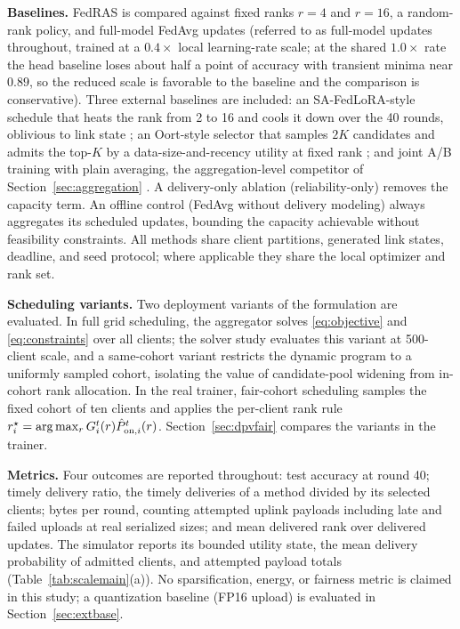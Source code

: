 \documentclass[a4paper,fleqn]{cas-dc}
\begin{document}
\textbf{Baselines.} FedRAS is compared against fixed ranks $r{=}4$ and $r{=}16$, a random-rank policy, and full-model FedAvg updates (referred to as full-model updates throughout, trained at a $0.4\times$ local learning-rate scale; at the shared $1.0\times$ rate the head baseline loses about half a point of accuracy with transient minima near $0.89$, so the reduced scale is favorable to the baseline and the comparison is conservative). Three external baselines are included: an SA-FedLoRA-style schedule that heats the rank from 2 to 16 and cools it down over the 40 rounds, oblivious to link state \cite{yang2024safedlora}; an Oort-style selector that samples $2K$ candidates and admits the top-$K$ by a data-size-and-recency utility at fixed rank \cite{oort2021oort}; and joint A/B training with plain averaging, the aggregation-level competitor of Section~\ref{sec:aggregation} \cite{guo2025fedsalora}. A delivery-only ablation (reliability-only) removes the capacity term. An offline control (FedAvg without delivery modeling) always aggregates its scheduled updates, bounding the capacity achievable without feasibility constraints. All methods share client partitions, generated link states, deadline, and seed protocol; where applicable they share the local optimizer and rank set.

\textbf{Scheduling variants.} Two deployment variants of the formulation are evaluated. In full grid scheduling, the aggregator solves \eqref{eq:objective} and \eqref{eq:constraints} over all clients; the solver study evaluates this variant at 500-client scale, and a same-cohort variant restricts the dynamic program to a uniformly sampled cohort, isolating the value of candidate-pool widening from in-cohort rank allocation. In the real trainer, fair-cohort scheduling samples the fixed cohort of ten clients and applies the per-client rank rule $r_i^\star=\arg\max_r G_i^t(r)\hat P_{{\rm on},i}^t(r)$. Section~\ref{sec:dpvfair} compares the variants in the trainer.

\textbf{Metrics.} Four outcomes are reported throughout: test accuracy at round 40; timely delivery ratio, the timely deliveries of a method divided by its selected clients; bytes per round, counting attempted uplink payloads including late and failed uploads at real serialized sizes; and mean delivered rank over delivered updates. The simulator reports its bounded utility state, the mean delivery probability of admitted clients, and attempted payload totals (Table~\ref{tab:scalemain}(a)). No sparsification, energy, or fairness metric is claimed in this study; a quantization baseline (FP16 upload) is evaluated in Section~\ref{sec:extbase}.
\end{document}
